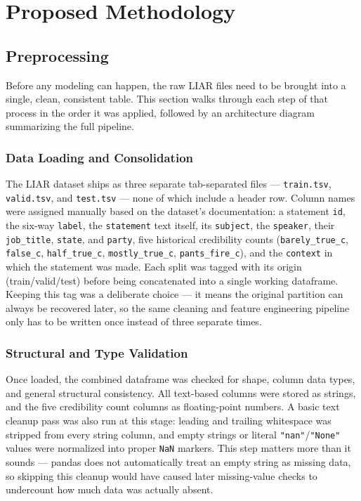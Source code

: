 \documentclass[a4paper,fleqn]{cas-sc}
\begin{document}
\section{Proposed Methodology}\label{sec:methodology}

\subsection{Preprocessing}\label{subsec:preprocessing}
Before any modeling can happen, the raw LIAR files need to be brought into a single, clean, consistent table. This section walks through each step of that process in the order it was applied, followed by an architecture diagram summarizing the full pipeline.

\subsubsection{Data Loading and Consolidation}
The LIAR dataset ships as three separate tab-separated files — \texttt{train.tsv}, \texttt{valid.tsv}, and \texttt{test.tsv} — none of which include a header row. Column names were assigned manually based on the dataset's documentation: a statement \texttt{id}, the six-way \texttt{label}, the \texttt{statement} text itself, its \texttt{subject}, the \texttt{speaker}, their \texttt{job\_title}, \texttt{state}, and \texttt{party}, five historical credibility counts (\texttt{barely\_true\_c}, \texttt{false\_c}, \texttt{half\_true\_c}, \texttt{mostly\_true\_c}, \texttt{pants\_fire\_c}), and the \texttt{context} in which the statement was made. Each split was tagged with its origin (train/valid/test) before being concatenated into a single working dataframe. Keeping this tag was a deliberate choice — it means the original partition can always be recovered later, so the same cleaning and feature engineering pipeline only has to be written once instead of three separate times.

\subsubsection{Structural and Type Validation}
Once loaded, the combined dataframe was checked for shape, column data types, and general structural consistency. All text-based columns were stored as strings, and the five credibility count columns as floating-point numbers. A basic text cleanup pass was also run at this stage: leading and trailing whitespace was stripped from every string column, and empty strings or literal \texttt{"nan"}/\texttt{"None"} values were normalized into proper \texttt{NaN} markers. This step matters more than it sounds — pandas does not automatically treat an empty string as missing data, so skipping this cleanup would have caused later missing-value checks to undercount how much data was actually absent.
\end{document}
